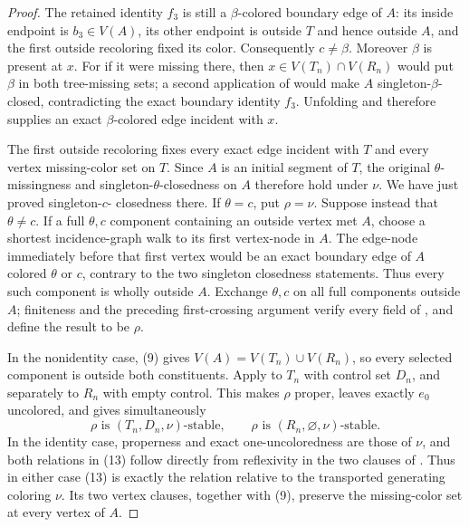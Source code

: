 \begin{proof}
The retained identity $f_3$ is still a $\beta$-colored boundary edge of
$A$: its inside endpoint is $b_3\in V(A)$, its other endpoint is outside
$T$ and hence outside $A$, and the first outside recoloring fixed its
color.  Consequently $c\ne\beta$.  Moreover $\beta$ is present at $x$.
For if it were missing there, then $x\in V(T_n)\cap V(R_n)$ would put
$\beta$ in both tree-missing sets; a second application of
 would make $A$
singleton-$\beta$-closed, contradicting the exact boundary identity
$f_3$.  Unfolding  and
 therefore supplies an exact $\beta$-colored edge
incident with $x$.

The first outside recoloring fixes every exact edge incident with $T$ and
every vertex missing-color set on $T$.  Since $A$ is an initial segment of
$T$, the original $\theta$-missingness and singleton-$\theta$-closedness
on $A$ therefore hold under $\nu$.  We have just proved singleton-$c$-
closedness there.  If $\theta=c$, put $\rho=\nu$.  Suppose instead that
$\theta\ne c$.  If a full $\theta,c$ component containing an outside
vertex met $A$, choose a shortest incidence-graph walk to its first
vertex-node in $A$.  The edge-node immediately before that first vertex
would be an exact boundary edge of $A$ colored $\theta$ or $c$, contrary
to the two singleton closedness statements.  Thus every such component is
wholly outside $A$.  Exchange $\theta,c$ on all full components outside
$A$; finiteness and the preceding first-crossing argument verify every
field of , and define the result to be
$\rho$.

In the nonidentity case, (9) gives
$V(A)=V(T_n)\cup V(R_n)$, so every selected component is outside both
constituents.  Apply  to $T_n$ with
control set $D_n$, and separately to $R_n$ with empty control.  This makes
$\rho$ proper, leaves exactly $e_0$ uncolored, and gives simultaneously
\[
 \rho\text{ is }(T_n,D_n,\nu)\text{-stable},\qquad
 \rho\text{ is }(R_n,\varnothing,\nu)\text{-stable}.           \tag{13}
\]
In the identity case, properness and exact one-uncoloredness are those of
$\nu$, and both relations in (13) follow directly from reflexivity in the
two clauses of .  Thus in either case (13) is
exactly the  relation relative to the
transported generating coloring $\nu$.  Its two vertex clauses, together
with (9), preserve the missing-color set at every vertex of $A$.


\end{proof}
